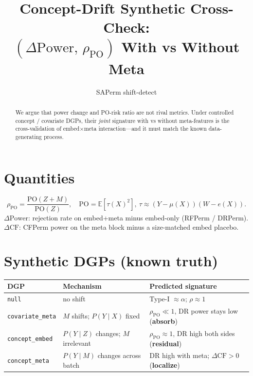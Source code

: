 \documentclass[11pt]{article}
\title{Concept-Drift Synthetic Cross-Check:\\
$(\Delta\mathrm{Power},\,\rho_{\mathrm{PO}})$ With vs Without Meta}
\author{SAPerm shift-detect}
\date{}
\begin{document}
\maketitle

\begin{abstract}
\noindent
We argue that power change and PO-risk ratio are not rival metrics.
Under controlled concept / covariate DGPs, their \emph{joint} signature
with vs without meta-features is the cross-validation of embed$\times$meta
interaction---and it must match the known data-generating process.
\end{abstract}

\section{Quantities}
\[
\rho_{\mathrm{PO}}=\frac{\mathrm{PO}(Z{+}M)}{\mathrm{PO}(Z)},
\quad
\mathrm{PO}=\mathbb{E}[\tau(X)^2],\
\tau\approx(Y-\mu(X))(W-e(X)).
\]
$\Delta\mathrm{Power}$: rejection rate on embed+meta minus embed-only
(RFPerm / DRPerm). $\Delta\mathrm{CF}$: CFPerm power on the meta block
minus a size-matched embed placebo.

\section{Synthetic DGPs (known truth)}
\begin{center}
\begin{tabular}{lll}
\toprule
DGP & Mechanism & Predicted signature \\
\midrule
\texttt{null} & no shift & Type-I $\approx\alpha$; $\rho\approx 1$ \\
\texttt{covariate\_meta} & $M$ shifts; $P(Y\mid X)$ fixed &
  $\rho_{\mathrm{PO}}\ll 1$, DR power stays low (\textbf{absorb}) \\
\texttt{concept\_embed} & $P(Y\mid Z)$ changes; $M$ irrelevant &
  $\rho_{\mathrm{PO}}\approx 1$, DR high both sides (\textbf{residual}) \\
\texttt{concept\_meta} & $P(Y\mid M)$ changes across batch &
  DR high with meta; $\Delta\mathrm{CF}>0$ (\textbf{localize}) \\
\bottomrule
\end{tabular}
\end{center}
\end{document}
